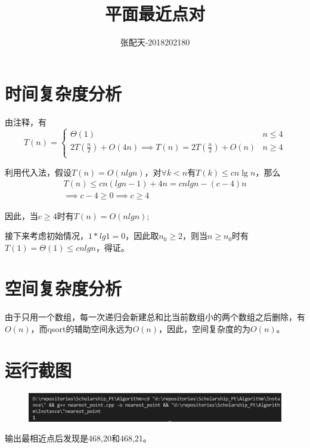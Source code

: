 \documentclass[UTF8]{ctexart}
\title{平面最近点对}
\author{张配天-2018202180}
\begin{document}
    \maketitle
    \section{时间复杂度分析}
    由注释，有
    \begin{equation}
        T(n) = \begin{cases}
            \Theta(1)&n\le 4\\
            2T(\frac{n}{2})+O(4n) \implies T(n) = 2T(\frac{n}{2}) + O(n) & n \ge 4\\
        \end{cases}
    \end{equation}
    
    \par 利用代入法，假设$T(n) = O(nlgn)$，对$\forall k < n$有$T(k) \leq cn\lg{n}$，那么
    \begin{gather*}
        T(n) \leq cn(lgn - 1) + 4n = cnlgn - (c-4)n\\
        \implies c-4 \ge 0\implies c \ge 4
    \end{gather*}
    \par 因此，当$c\ge 4$时有$T(n) = O(nlgn)$;
    \par 接下来考虑初始情况，$1*lg1 = 0$，因此取$n_0 \ge 2$，则当$n\ge n_0$时有$T(1) = \Theta(1) \leq cnlgn$，得证。
    \section{空间复杂度分析}
    由于只用一个数组，每一次递归会新建总和比当前数组小的两个数组之后删除，有$O(n)$，而qsort的辅助空间永远为$O(n)$，因此，空间复杂度的为$O(n)$。
    \section{运行截图}
    \begin{figure}[H]
        \centering
        \includegraphics[width=18cm]{../Resources/1.png}
    \end{figure}
    \par 输出最相近点后发现是468,20和468,21。
\end{document}

